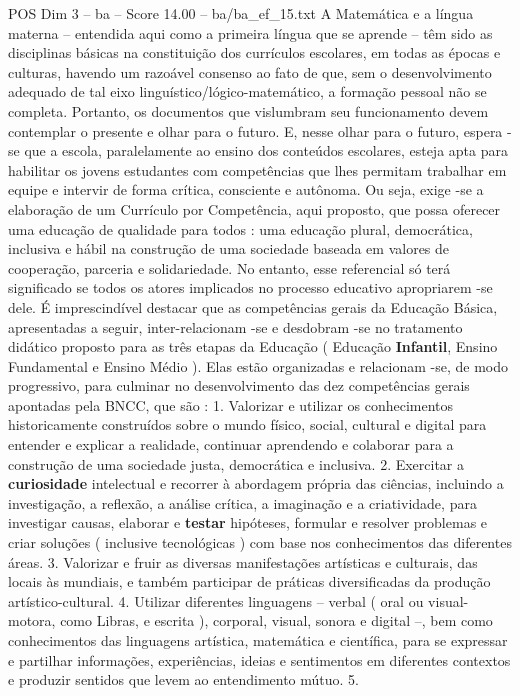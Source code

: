 \begin{textsample}{POS Dim 3 – ba – Score 14.00 – ba/ba\_ef\_15.txt}
A Matemática e a língua materna – entendida aqui como a primeira língua que se aprende – têm sido as disciplinas básicas na constituição dos currículos escolares, em todas as épocas e culturas, havendo um razoável consenso ao fato de que, sem o desenvolvimento adequado de tal eixo linguístico/lógico-matemático, a formação pessoal não se completa.
Portanto, os documentos que vislumbram seu funcionamento devem contemplar o presente e olhar para o futuro.
E, nesse olhar para o futuro, espera -se que a escola, paralelamente ao ensino dos conteúdos escolares, esteja apta para habilitar os jovens estudantes com competências que lhes permitam trabalhar em equipe e intervir de forma crítica, consciente e autônoma.
Ou seja, exige -se a elaboração de um Currículo por Competência, aqui proposto, que possa oferecer uma educação de qualidade para todos : uma educação plural, democrática, inclusiva e hábil na construção de uma sociedade baseada em valores de cooperação, parceria e solidariedade.
No entanto, esse referencial só terá significado se todos os atores implicados no processo educativo apropriarem -se dele.
É imprescindível destacar que as competências gerais da Educação Básica, apresentadas a seguir, inter-relacionam -se e desdobram -se no tratamento didático proposto para as três etapas da Educação ( Educação \textbf{Infantil}, Ensino Fundamental e Ensino Médio ).
Elas estão organizadas e relacionam -se, de modo progressivo, para culminar no desenvolvimento das dez competências gerais apontadas pela BNCC, que são : 1.
Valorizar e utilizar os conhecimentos historicamente construídos sobre o mundo físico, social, cultural e digital para entender e explicar a realidade, continuar aprendendo e colaborar para a construção de uma sociedade justa, democrática e inclusiva. 2.
Exercitar a \textbf{curiosidade} intelectual e recorrer à abordagem própria das ciências, incluindo a investigação, a reflexão, a análise crítica, a imaginação e a criatividade, para investigar causas, elaborar e \textbf{testar} hipóteses, formular e resolver problemas e criar soluções ( inclusive tecnológicas ) com base nos conhecimentos das diferentes áreas. 3.
Valorizar e fruir as diversas manifestações artísticas e culturais, das locais às mundiais, e também participar de práticas diversificadas da produção artístico-cultural. 4.
Utilizar diferentes linguagens – verbal ( oral ou visual-motora, como Libras, e escrita ), corporal, visual, sonora e digital –, bem como conhecimentos das linguagens artística, matemática e científica, para se expressar e partilhar informações, experiências, ideias e sentimentos em diferentes contextos e produzir sentidos que levem ao entendimento mútuo. 5.

\end{textsample}
